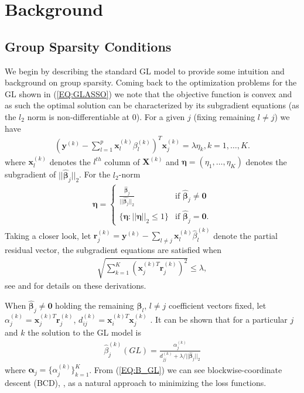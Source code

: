 \documentclass{article}
\numberwithin{equation}{section}
\theoremstyle{plain}
\newcommand{\bs}{\boldsymbol}
\begin{document}
\section{Background}
\label{SEC:BACK}


\subsection{Group Sparsity Conditions}
\label{SEC:GSC}

We begin by describing the standard GL model to provide some intuition and
background on group sparsity. Coming back to the optimization problems for the
GL shown in (\ref{EQ:GLASSO}) we note that the objective function is
convex and as such the optimal solution can be characterized by its
subgradient equations (as the $l_2$ norm is 
non-differentiable at 0). For 
a given $j$ (fixing remaining $l \neq j$) we have
\begin{align}
\label{EQ:SUBG0}
(\mathbf{y}^{(k)} - \sum_{l=1}^p \mathbf{x}^{(k)}_l\beta_l^{(k)})^T
\mathbf{x}^{(k)}_j = \lambda \eta_k, k = 1,\ldots,K.
\end{align}
\noindent where $\mathbf{x}_l^{(k)}$ denotes the $l^{th}$ column of
$\mathbf{X}^{(k)}$ and $\bs\eta = (\eta_1, \ldots, \eta_K)$ denotes the
subgradient of $||\hat{\bs\beta}_j||_2$. 
For the $l_2$-norm
\begin{align}
\label{EQ:L2_DIFFL}
\bs\eta = 
\left\{
\begin{array}{cc}
\frac{\hat{\bs\beta}_j}{||\hat{\bs\beta_j}||_2} & \mbox{if } \hat{\bs\beta}_j
\neq
\mathbf{0}
\\
\{\bs\eta: ||\bs\eta||_2 \leq 1 \} & \mbox{if } \hat{\bs\beta}_j =
\mathbf{0}.
\end{array}
\right.
\end{align}
Taking a closer look, let $\mathbf{r}_j^{(k)} = \mathbf{y}^{(k)} - \sum_{l
\neq j} \mathbf{x}^{(k)}_l \hat{\beta}_l^{(k)}$ denote the partial residual
vector, the
subgradient equations are satisfied when
\begin{align}
\label{EQ:GTH_L2}
\sqrt{\sum_{k=1}^K (\mathbf{x}^{(k)T}_j \mathbf{r}_j^{(k)})^2} \leq \lambda,
\end{align}
\noindent see \cite{simon2013} and \cite{friedman2010note}
for details on these derivations.

When  
$\hat{\bs\beta}_j \neq \mathbf{0}$ holding the remaining $\bs\beta_l$, $l \neq
j$ coefficient vectors fixed,
let $\alpha_j^{(k)} = \mathbf{x}^{(k)T}_j \mathbf{r}_j^{(k)}$, $d^{(k)}_{ij} =
\mathbf{x}_i^{(k)T} \mathbf{x}^{(k)}_j$ . 
It
can be shown that for a particular $j$ and $k$ the
solution to the GL model is
\begin{align}
\label{EQ:B_GL}
\hat{\beta}_j^{(k)}(GL) = \frac{\alpha_j^{(k)}}{d^{(k)}_{jj} +
\lambda/||\hat{\bs\beta}_j||_2} 
\end{align}
\noindent where $\bs\alpha_j = \{\alpha_j^{(k)}\}_{k=1}^K$. From
(\ref{EQ:B_GL}) we can see blockwise-coordinate descent (BCD),
\cite{nonlin1999}, \cite{tseng2001} as
a natural approach to minimizing the loss functions. 
\end{document}
